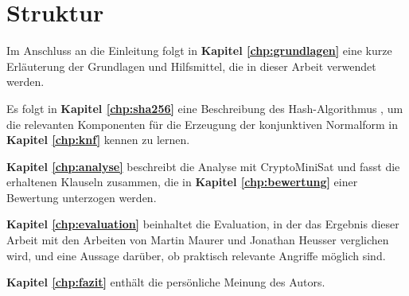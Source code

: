 \section{Struktur}

Im Anschluss an die Einleitung folgt in \textbf{Kapitel \ref{chp:grundlagen}} eine kurze
Erläuterung der Grundlagen und Hilfsmittel, die in dieser Arbeit verwendet werden.

Es folgt in \textbf{Kapitel \ref{chp:sha256}} eine Beschreibung des Hash-Algorithmus , um die relevanten
Komponenten für die Erzeugung der konjunktiven Normalform in \textbf{Kapitel \ref{chp:knf}} kennen zu lernen.

\textbf{Kapitel \ref{chp:analyse}} beschreibt die Analyse mit CryptoMiniSat und fasst die erhaltenen Klauseln
zusammen, die in \textbf{Kapitel \ref{chp:bewertung}} einer Bewertung unterzogen werden.

\textbf{Kapitel \ref{chp:evaluation}} beinhaltet die Evaluation, in der das Ergebnis dieser Arbeit mit den
Arbeiten von Martin Maurer und Jonathan Heusser verglichen wird, und eine Aussage darüber, ob praktisch
relevante Angriffe möglich sind.

\textbf{Kapitel \ref{chp:fazit}} enthält die persönliche Meinung des Autors.